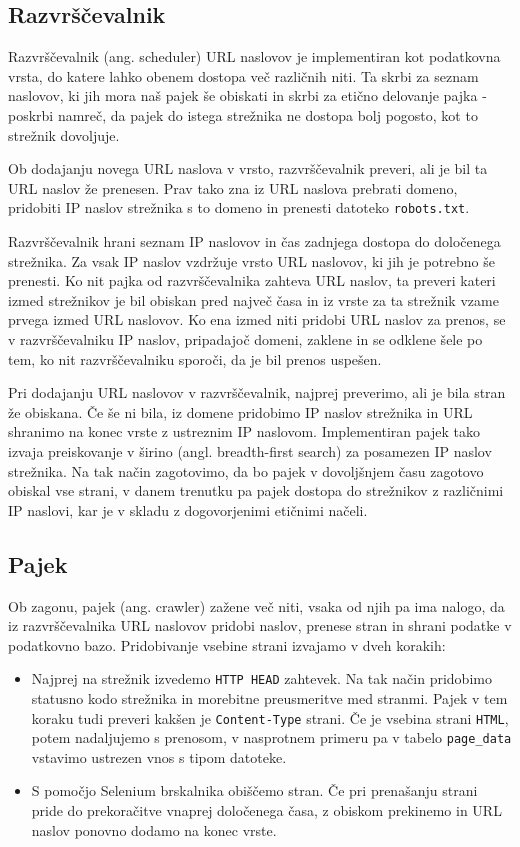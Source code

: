 \documentclass[conference]{IEEEtran}
\begin{document}
	\subsection{Razvrščevalnik}

	Razvrščevalnik (ang. scheduler) URL naslovov je implementiran kot podatkovna vrsta, do katere lahko obenem dostopa več različnih niti. Ta skrbi za seznam naslovov, ki jih mora naš pajek še obiskati in skrbi za etično delovanje pajka - poskrbi namreč, da pajek do istega strežnika ne dostopa bolj pogosto, kot to strežnik dovoljuje.
	
	Ob dodajanju novega URL naslova v vrsto, razvrščevalnik preveri, ali je bil ta URL naslov že prenesen. Prav tako zna iz URL naslova prebrati domeno, pridobiti IP naslov strežnika s to domeno in prenesti datoteko \texttt{robots.txt}.
	
	Razvrščevalnik hrani seznam IP naslovov in čas zadnjega dostopa do določenega strežnika. Za vsak IP naslov vzdržuje vrsto URL naslovov, ki jih je potrebno še prenesti. Ko nit pajka od razvrščevalnika zahteva URL naslov, ta preveri kateri izmed strežnikov je bil obiskan pred največ časa in iz vrste za ta strežnik vzame prvega izmed URL naslovov. Ko ena izmed niti pridobi URL naslov za prenos, se v razvrščevalniku IP naslov, pripadajoč domeni, zaklene in se odklene šele po tem, ko nit razvrščevalniku sporoči, da je bil prenos uspešen.
	
	Pri dodajanju URL naslovov v razvrščevalnik, najprej preverimo, ali je bila stran že obiskana. Če še ni bila, iz domene pridobimo IP naslov strežnika in URL shranimo na konec vrste z ustreznim IP naslovom. Implementiran pajek tako izvaja preiskovanje v širino (angl. breadth-first search) za posamezen IP naslov strežnika. Na tak način zagotovimo, da bo pajek v dovoljšnjem času zagotovo obiskal vse strani, v danem trenutku pa pajek dostopa do strežnikov z različnimi IP naslovi, kar je v skladu z dogovorjenimi etičnimi načeli.
	
	\subsection{Pajek}
	
	Ob zagonu, pajek (ang. crawler) zažene več niti, vsaka od njih pa ima nalogo, da iz razvrščevalnika URL naslovov pridobi naslov, prenese stran in shrani podatke v podatkovno bazo. Pridobivanje vsebine strani izvajamo v dveh korakih:
	
	\begin{itemize}
		\item Najprej na strežnik izvedemo \texttt{HTTP HEAD} zahtevek. Na tak način pridobimo statusno kodo strežnika in morebitne preusmeritve med stranmi. Pajek v tem koraku tudi preveri kakšen je \texttt{Content-Type} strani. Če je vsebina strani \texttt{HTML}, potem nadaljujemo s prenosom, v nasprotnem primeru pa v tabelo \texttt{page\_data} vstavimo ustrezen vnos s tipom datoteke.
		\item S pomočjo Selenium brskalnika obiščemo stran. Če pri prenašanju strani pride do prekoračitve vnaprej določenega časa, z obiskom prekinemo in URL naslov ponovno dodamo na konec vrste.
	\end{itemize}
\end{document}

